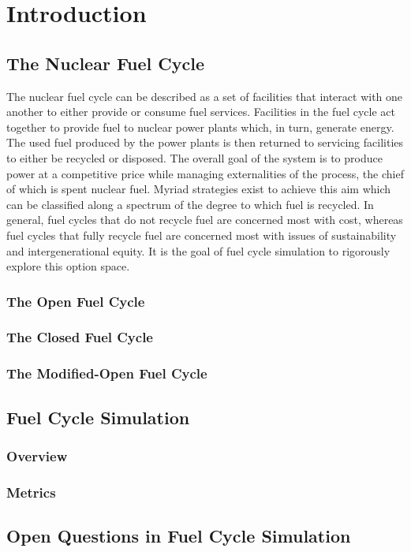 \chapter{Introduction}\label{ch:intro}

\section{The Nuclear Fuel Cycle}

The nuclear fuel cycle can be described as a set of facilities that interact
with one another to either provide or consume fuel services. Facilities in the
fuel cycle act together to provide fuel to nuclear power plants which, in turn,
generate energy. The used fuel produced by the power plants is then returned to
servicing facilities to either be recycled or disposed. The overall goal of the
system is to produce power at a competitive price while managing externalities
of the process, the chief of which is spent nuclear fuel. Myriad strategies
exist to achieve this aim which can be classified along a spectrum of the degree
to which fuel is recycled. In general, fuel cycles that do not recycle fuel are
concerned most with cost, whereas fuel cycles that fully recycle fuel are
concerned most with issues of sustainability and intergenerational equity. It is
the goal of fuel cycle simulation to rigorously explore this option space.

\subsection{The Open Fuel Cycle}


\subsection{The Closed Fuel Cycle}


\subsection{The Modified-Open Fuel Cycle}


\section{Fuel Cycle Simulation}

\subsection{Overview}\label{sec:simulators-overview}


\subsection{Metrics}


\section{Open Questions in Fuel Cycle Simulation}

